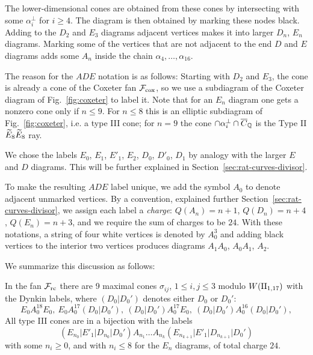 \documentclass[table,x11names]{amsart}
\begin{document}
The lower-dimensional cones are obtained from these cones by
intersecting with some $\alpha_i^\perp$ for $i\ge4$. The diagram is
then obtained by marking these nodes black. Adding to the $D_2$ and
$E_3$ diagrams adjacent vertices makes it into larger $D_n$, $E_n$
diagrams. Marking some of the vertices that are not adjacent to the
end $D$ and $E$ diagrams adds some $A_n$ inside the chain
$\alpha_4,\dotsc,\alpha_{16}$.

\begin{remark}
  The reason for the $ADE$ notation is as follows: Starting with $D_2$
  and $E_3$, the cone is already a cone of the Coxeter fan ${\mathcal F}_{\rm cox}$,
  so we use a subdiagram of the Coxeter diagram of
  Fig.~\ref{fig:coxeter} to label it.
  Note that for an $E_n$ diagram one gets a nonzero cone only if
  $n\le9$. For $n\le 8$ this is an elliptic subdiagram of
  Fig.~\ref{fig:coxeter}, i.e. a type III cone; for $n=9$ the cone
  $\cap\alpha_i^\perp \cap {\overline C}_{\mathbb Q}$ is the Type II ${\widetilde E}_8{\widetilde E}_8$ ray.

  We chose the labels $E_0$, $E_1$, $E'_1$, $E_2$, $D_0$, $D'_0$,
  $D_1$ 
  by analogy with the larger
  $E$ and $D$ diagrams. This will be further explained in
  Section~\ref{sec:rat-curves-divisor}.
\end{remark}

\begin{notation}
  To make the resulting $ADE$ label unique, we add the symbol
  $A_0$ to denote adjacent unmarked vertices.
  By a convention, explained further
  Section~\ref{sec:rat-curves-divisor}, we assign each
  label a \emph{charge}: $Q(A_n)=n+1$,
  $Q(D_n)=n+4$, $Q(E_n)=n+3$, and we require the sum of charges to be
  $24$. With these notations, a string of four white vertices is
  denoted by $A_0^3$ and adding black vertices to the interior two vertices
  produces diagrams $A_1A_0$, $A_0A_1$, $A_2$.
\end{notation}

We summarize this discussion as follows:

\begin{lemma}\label{lem:rc-cones}
  In the fan ${\mathcal F}_{\rm rc}$ there are 9 maximal cones $\sigma_{ij}$, $1\le i,j\le
  3$ modulo $W(\II_{1,17})$ with the Dynkin labels,
  where $(D_0|D_0')$ denotes either $D_0$ or $D_0'$:
  \begin{displaymath}
  E_0A_0^{18}E_0,\ 
  E_0A_0^{17}(D_0|D_0'),\  (D_0|D_0')A_0^{17}E_0, \ 
  (D_0|D_0') A_0^{16} (D_0|D_0'),
  \end{displaymath}
  All type III cones are in a bijection with the labels
  \begin{displaymath}
    (E_{n_0}|E'_1|D_{n_0}|D_0') A_{n_1}\dotsc A_{n_k}
    (E_{n_{k+1}}|E'_1|D_{n_{k+1}}|D_0')
  \end{displaymath}
  with some $n_i\ge0$, and with $n_i\le 8$ for the $E_n$ diagrams, of
  total charge $24$.
\end{lemma}
\end{document}
